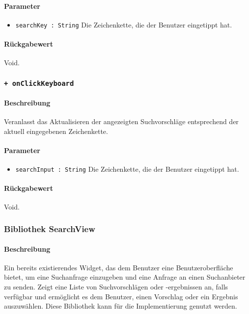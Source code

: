 \paragraph*{Parameter}
\begin{itemize}
    \item \texttt{searchKey : String} Die Zeichenkette, die der Benutzer eingetippt hat.
\end{itemize}
\paragraph*{Rückgabewert}
Void.

\subsubsection*{\texttt{+ onClickKeyboard}}%
\paragraph*{Beschreibung}
Veranlasst das Aktualisieren der angezeigten Suchvorschläge entsprechend der aktuell eingegebenen Zeichenkette.
\paragraph*{Parameter}
\begin{itemize}
    \item \texttt{searchInput : String} Die Zeichenkette, die der Benutzer eingetippt hat.
\end{itemize}
\paragraph*{Rückgabewert}
Void.


\subsubsection*{Bibliothek SearchView}
\paragraph*{Beschreibung}
Ein bereits existierendes Widget, das dem Benutzer eine Benutzeroberfläche bietet, um eine Suchanfrage einzugeben und eine Anfrage an einen Suchanbieter zu senden. 
Zeigt eine Liste von Suchvorschlägen oder -ergebnissen an, falls verfügbar 
und ermöglicht es dem Benutzer, einen Vorschlag oder ein Ergebnis auszuwählen.
Diese Bibliothek kann für die Implementierung genutzt werden.